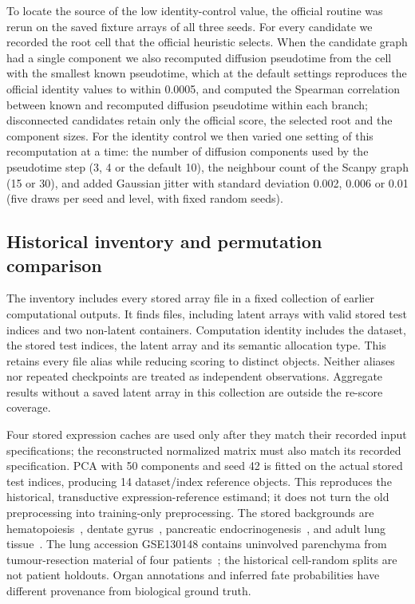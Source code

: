 \documentclass[11pt]{article}
\begin{document}
To locate the source of the low identity-control value, the official routine was rerun on the saved fixture arrays of all three seeds. For every candidate we recorded the root cell that the official heuristic selects. When the candidate graph had a single component we also recomputed diffusion pseudotime from the cell with the smallest known pseudotime, which at the default settings reproduces the official identity values to within 0.0005, and computed the Spearman correlation between known and recomputed diffusion pseudotime within each branch; disconnected candidates retain only the official score, the selected root and the component sizes. For the identity control we then varied one setting of this recomputation at a time: the number of diffusion components used by the pseudotime step (3, 4 or the default 10), the neighbour count of the Scanpy graph (15 or 30), and added Gaussian jitter with standard deviation 0.002, 0.006 or 0.01 (five draws per seed and level, with fixed random seeds).



\subsection{Historical inventory and permutation comparison}

The inventory includes every stored array file in a fixed collection of earlier computational outputs. It finds \InventoryFiles{} files, including \LatentFiles{} latent arrays with valid stored test indices and two non-latent containers. Computation identity includes the dataset, the stored test indices, the latent array and its semantic allocation type. This retains every file alias while reducing scoring to \UniqueScores{} distinct objects. Neither aliases nor repeated checkpoints are treated as independent observations. Aggregate results without a saved latent array in this collection are outside the re-score coverage.

Four stored expression caches are used only after they match their recorded input specifications; the reconstructed normalized matrix must also match its recorded specification. PCA with 50 components and seed 42 is fitted on the actual stored test indices, producing 14 dataset/index reference objects. This reproduces the historical, transductive expression-reference estimand; it does not turn the old preprocessing into training-only preprocessing. The stored backgrounds are hematopoiesis~\cite{setty2019palantir}, dentate gyrus~\cite{hochgerner2018conserved}, pancreatic endocrinogenesis~\cite{bastidas2019endocrinogenesis}, and adult lung tissue~\cite{vieirabraga2019lung}. The lung accession GSE130148 contains uninvolved parenchyma from tumour-resection material of four patients~\cite{lung_geo130148}; the historical cell-random splits are not patient holdouts. Organ annotations and inferred fate probabilities have different provenance from biological ground truth.
\end{document}
